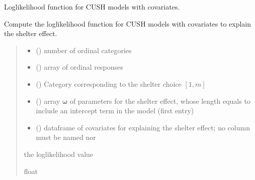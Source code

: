 \documentclass[letterpaper,10pt,english]{sphinxmanual}
\begin{document}

\begin{fulllineitems}
\label{\detokenize{cubmods:cubmods.cush_x.loglik}}
\pysigstartsignatures
{}
\pysigstopsignatures
\sphinxAtStartPar
Log\sphinxhyphen{}likelihood function for CUSH models with covariates.

\sphinxAtStartPar
Compute the log\sphinxhyphen{}likelihood function for CUSH models with covariates 
to explain the shelter effect.
\begin{quote}\begin{description}
\begin{itemize}
\item {} 
\sphinxAtStartPar
{} () \textendash{} number of ordinal categories

\item {} 
\sphinxAtStartPar
{} () \textendash{} array of ordinal responses

\item {} 
\sphinxAtStartPar
{} () \textendash{} Category corresponding to the shelter choice \([1,m]\)

\item {} 
\sphinxAtStartPar
{} () \textendash{} array \(\pmb \omega\) of parameters for the shelter effect, whose length equals 
 to include an intercept term in the model (first entry)

\item {} 
\sphinxAtStartPar
{} () \textendash{} dataframe of covariates for explaining the shelter effect;
no column must be named  nor 

\end{itemize}

\sphinxAtStartPar
the log\sphinxhyphen{}likelihood value

\sphinxAtStartPar
float

\end{description}\end{quote}

\end{fulllineitems}
\end{document}
